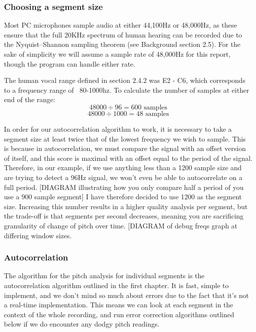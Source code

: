 \subsubsection{Choosing a segment size}
\par Most PC microphones sample audio at either 44,100Hz or 48,000Hz, as these ensure that the full 20KHz spectrum of human hearing can be recorded due to the Nyquist–Shannon sampling theorem (see Background section 2.5). For the sake of simplicity we will assume a sample rate of 48,000Hz for this report, though the program can handle either rate.
\par The human vocal range defined in section 2.4.2 was E2 - C6, which corresponds to a frequency range of ~80-1000hz\cite{scientificPitchTable}. To calculate the number of samples at either end of the range: 
 		 \[48000\div 96 = 600 \text{ samples}\] 
		 \[48000\div 1000 = 48 \text{ samples}\]
		
\par In order for our autocorrelation algorithm to work, it is  necessary to take a segment size at least twice that of the lowest frequency we wish to sample.
This is because in autocorrelation, we must compare the signal with an offset version of itself, and this score is maximal with an offset equal to the period of the signal. Therefore, in our example, if we use anything less than a 1200 sample size and are trying to detect a 96Hz signal, we won't even be able to autocorrelate on a full period. [DIAGRAM illustrating how you only compare half a period of you use a 900 sample segment] I have therefore decided to use 1200 as the segment size. Increasing this number results in a higher quality analysis per segment, but the trade-off is that segments per second decreases, meaning you are sacrificing granularity of change of pitch over time. [DIAGRAM of debug freqs graph at differing window sizes.

\subsubsection{Autocorrelation}
The algorithm for the pitch analysis for individual segments is the autocorrelation algorithm outlined in the first chapter. It is fast, simple to implement, and we don't mind so much about errors due to the fact that it's not a real-time implementation. This means we can look at each segment in the context of the whole recording, and run error correction algorithms outlined below if we do encounter any dodgy pitch readings.

